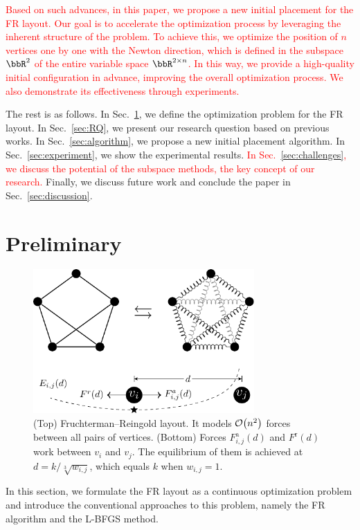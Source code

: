 \documentclass[dvipdfmx,journal]{IEEEtran}
\newcommand{\red}[1]{\textcolor{red}{#1}}
\begin{document}
\red{
  Based on such advances, in this paper, we propose a new initial placement for the FR layout.
  Our goal is to accelerate the optimization process by leveraging the inherent structure of the problem.
  To achieve this, we optimize the position of $n$ vertices one by one with the Newton direction, which is defined in the subspace $\bbR^2$ of the entire variable space $\bbR^{2 \times n}$.
  In this way, we provide a high-quality initial configuration in advance, improving the overall optimization process.
  We also demonstrate its effectiveness through experiments.
}

The rest is as follows.
In Sec.~\ref{sec:preliminary}, we define the optimization problem for the FR layout.
In Sec.~\ref{sec:RQ}, we present our research question based on previous works.
In Sec.~\ref{sec:algorithm}, we propose a new initial placement algorithm.
In Sec.~\ref{sec:experiment}, we show the experimental results.
\red{In Sec.~\ref{sec:challenges}, we discuss the potential of the subspace methods, the key concept of our research.}
Finally, we discuss future work and conclude the paper in Sec.~\ref{sec:discussion}.

\section{Preliminary}\label{sec:preliminary}

\begin{figure}[t]
  \centering
  \includegraphics[height=5.5cm]{fr_layout/fr_layout.pdf}
  \caption{
    (Top) Fruchterman--Reingold layout. It models $\order{n^2}$ forces between all pairs of vertices.
    (Bottom) Forces $F_{i,j}^\mathrm{a}(d)$ and $F^\mathrm{r}(d)$ work between $v_i$ and $v_j$. The equilibrium of them is achieved at $d = k/\sqrt[3]{w_{i,j}}$, which equals $k$ when $w_{i,j} = 1$.
  }
  \label{fig:frLayout}
\end{figure}

In this section, we formulate the FR layout as a continuous optimization problem and introduce the conventional approaches to this problem, namely the FR algorithm and the L-BFGS method.
\end{document}
